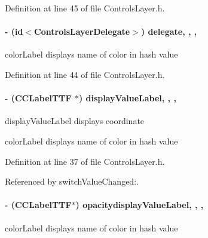 Definition at line 45 of file Controls\-Layer.\-h.

\hypertarget{interface_controls_layer_aebfe5471226d1bc0afef5d662219f913}{
\paragraph[{delegate}]{\setlength{\rightskip}{0pt plus 5cm}-\/ (id$<${\bf Controls\-Layer\-Delegate}$>$) delegate\hspace{0.3cm}{\ttfamily [read]}, {\ttfamily [write]}, {\ttfamily [nonatomic]}, {\ttfamily [weak]}}}\label{d1/d1a/interface_controls_layer_aebfe5471226d1bc0afef5d662219f913}
color\-Label displays name of color in hash value 

Definition at line 44 of file Controls\-Layer.\-h.

\hypertarget{interface_controls_layer_ab9f12f7a90a0bf6ae1abaeb4d4c4e378}{
\paragraph[{display\-Value\-Label}]{\setlength{\rightskip}{0pt plus 5cm}-\/ (C\-C\-Label\-T\-T\-F $\ast$) display\-Value\-Label\hspace{0.3cm}{\ttfamily [read]}, {\ttfamily [write]}, {\ttfamily [nonatomic]}, {\ttfamily [strong]}}}\label{d1/d1a/interface_controls_layer_ab9f12f7a90a0bf6ae1abaeb4d4c4e378}
display\-Value\-Label displays coordinate

color\-Label displays name of color in hash value 

Definition at line 37 of file Controls\-Layer.\-h.



Referenced by switch\-Value\-Changed\-:.

\hypertarget{interface_controls_layer_a1a60fd6edd83a2789b575845390a44be}{
\paragraph[{opacitydisplay\-Value\-Label}]{\setlength{\rightskip}{0pt plus 5cm}-\/ (C\-C\-Label\-T\-T\-F$\ast$) opacitydisplay\-Value\-Label\hspace{0.3cm}{\ttfamily [read]}, {\ttfamily [write]}, {\ttfamily [nonatomic]}, {\ttfamily [strong]}}}\label{d1/d1a/interface_controls_layer_a1a60fd6edd83a2789b575845390a44be}
color\-Label displays name of color in hash value 

